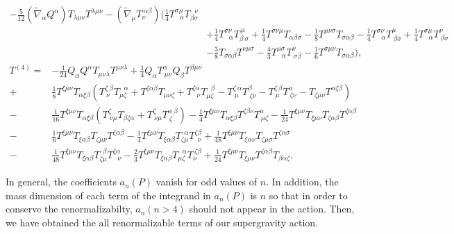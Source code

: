 \documentclass{ptephy}%
\begin{document}
\begin{align}
-\frac{5}{12}(\tilde{\nabla}_\alpha Q^\alpha)T_{\lambda\mu\nu}T^{\lambda\mu\nu} 
- (\tilde{\nabla}_\mu T_\nu^{\ \alpha\beta})(
\frac{1}{4}T^{\sigma\mu}_{\ \ \ \alpha}T_{\beta\sigma}^{\ \ \ \nu} \nonumber \\
& + \frac{1}{4}T^{\sigma\nu}_{\ \ \ \alpha}T_{\beta\ \sigma}^{\ \mu}
+ \frac{1}{4}T^{\sigma\nu\mu}T_{\alpha\beta\sigma}-\frac{1}{8}T^{\mu\nu\sigma}T_{\sigma\alpha\beta}
-\frac{1}{4}T^{\sigma\nu}_{\ \ \ \alpha}T^\mu_{\ \beta\sigma} 
+ \frac{1}{4}T^{\sigma\mu}_{\ \ \ \alpha}T^\nu_{\ \beta\sigma} \nonumber \\
& -\frac{3}{8}T_{\sigma\alpha\beta}T^{\nu\mu\sigma} 
-\frac{4}{3}T^{\mu\sigma}_{\ \ \ \alpha}T^\nu_{\ \sigma\beta}
- \frac{1}{6}T^{\sigma\mu\nu}T_{\sigma\alpha\beta}),
\end{align}
\begin{align}
T^{(4)}
= & -\frac{1}{24}Q_\alpha Q^\alpha T_{\mu\nu\lambda}T^{\mu\nu\lambda}
+\frac{1}{4}Q_\alpha T^\alpha_{\ \mu\nu}Q_\beta T^{\beta\mu\nu} \nonumber \\
+ & \frac{1}{8}T^{\xi\mu\nu}T_{\alpha\xi\beta}(T^{\zeta\ \beta}_{\ \nu}T_{\mu\zeta}^{\ \ \ \alpha}
+T^{\zeta\alpha\beta}T_{\mu\nu\zeta}
+T^{\zeta\alpha}_{\ \ \ \nu}T_{\mu\zeta}^{\ \ \ \beta} 
-T^{\zeta\ \alpha}_{\ \mu}T_{\ \zeta\nu}^{\beta}
-T^{\zeta\ \beta}_{\ \mu}T_{\ \zeta\nu}^{\alpha}
-T_{\zeta\mu\nu}T^{\alpha\zeta\beta})  \nonumber \\
- & \frac{1}{16}T^{\xi\mu\nu}T_{\alpha\xi\beta}(T^\zeta_{\ \nu\mu}T_{\beta\zeta\alpha}
+T^\zeta_{\ \nu\mu}T^{\alpha\ \beta}_{\ \zeta})
-\frac{1}{4}T^{\xi\mu\nu}T_{\alpha\xi\beta}T^{\zeta\beta\nu}T^\alpha_{\ \mu\zeta}
- \frac{1}{24}T^{\xi\mu\nu}T_{\xi\mu\nu}T_{\zeta\alpha\beta}T^{\zeta\alpha\beta} \nonumber \\
- & \frac{1}{6}T^{\xi\mu\nu}T_{\xi\alpha\beta}T_{\zeta\mu\nu}T^{\zeta\alpha\beta} 
-\frac{1}{4}T^{\xi\mu\nu}T_{\xi\alpha\beta}T_{\zeta\mu}^{\ \ \alpha}T^{\zeta\beta}_{\ \ \nu}
+\frac{1}{48}T^{\xi\mu\nu}T_{\xi\alpha\nu}T_{\zeta\mu\sigma}T^{\zeta\alpha\sigma} \nonumber\\
- & \frac{1}{48}T^{\xi\mu\nu}T_{\xi\alpha\beta}T_{\zeta\mu}^{\ \ \beta}T^{\zeta\alpha}_{\ \ \ \nu} 
-\frac{2}{3}T^{\xi\mu\nu}T_{\xi\alpha\beta}T_{\mu\zeta}^{\ \ \ \alpha}T_\nu^{\ \zeta\beta} 
+\frac{1}{24}T^{\xi\mu\nu}T_{\xi\mu\nu}T^{\zeta\alpha\beta}T_{\beta\alpha\zeta}.
\end{align}

In general, the coefficients $a_n(P)$ vanish for odd values of $n$\cite{gilkey}. In addition, the mass 
dimension of each term of the integrand in $a_n(P)$ is $n$ so that in order to conserve 
the renormalizabilty, $a_n(n>4)$  should not appear in the action. 
Then, we have obtained the all renormalizable terms of our supergravity action.   
\end{document}
